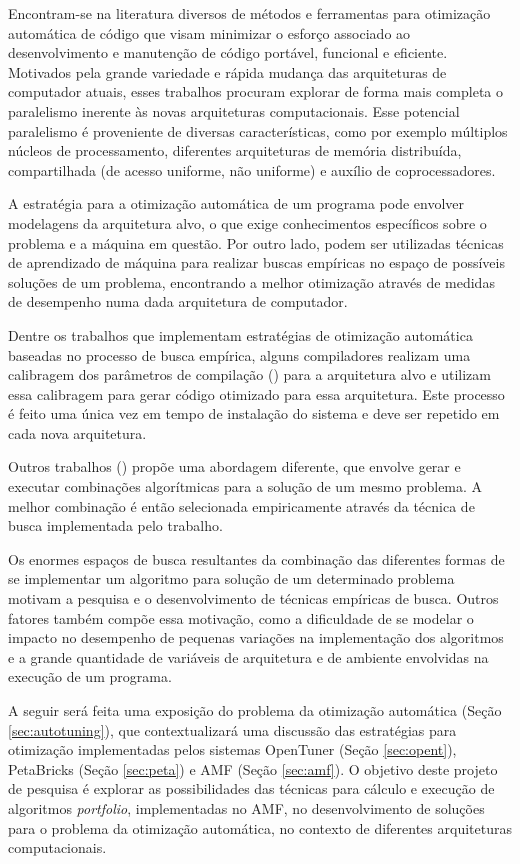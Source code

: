 \documentclass[a4paper, 12pt]{article}
\begin{document}
Encontram-se na literatura diversos de métodos e ferramentas para otimização 
automática de código que visam minimizar o esforço associado ao desenvolvimento
e manutenção de código portável, funcional e eficiente. Motivados pela grande
variedade e rápida mudança das arquiteturas de computador atuais, esses 
trabalhos procuram explorar de forma mais completa o paralelismo inerente às
novas arquiteturas computacionais. Esse potencial paralelismo é proveniente de
diversas características, como por exemplo múltiplos núcleos de processamento, 
diferentes arquiteturas de memória distribuída, compartilhada (de acesso 
uniforme, não uniforme) e auxílio de coprocessadores.

A estratégia para a otimização automática de um programa pode envolver 
modelagens da arquitetura alvo, o que exige conhecimentos específicos sobre o 
problema e a máquina em questão. Por outro lado, podem ser utilizadas técnicas
de aprendizado de máquina para realizar buscas empíricas no espaço de possíveis
soluções de um problema, encontrando a melhor otimização através de medidas de 
desempenho numa dada arquitetura de computador.

Dentre os trabalhos que implementam estratégias de otimização automática 
baseadas no processo de busca empírica, alguns compiladores realizam uma 
calibragem dos parâmetros de compilação (\citet{bilmes1997,whaley1998}) para a
arquitetura alvo e utilizam essa calibragem para gerar código otimizado para
essa arquitetura. Este processo é feito uma única vez em tempo de instalação
do sistema e deve ser repetido em cada nova arquitetura.

Outros trabalhos (\citet{goldman2012framework,mitcsail-tr:2014,
vuduc2004}) propõe uma abordagem diferente, que envolve gerar e executar
combinações algorítmicas para a solução de um mesmo problema. A melhor
combinação é então selecionada empiricamente através da técnica de busca
implementada pelo trabalho.

Os enormes espaços de busca resultantes da combinação das diferentes formas de
se implementar um algoritmo para solução de um determinado problema motivam
a pesquisa e o desenvolvimento de técnicas empíricas de busca. Outros fatores 
também compõe essa motivação, como a dificuldade de se modelar o impacto no 
desempenho de pequenas variações na implementação dos algoritmos e a grande 
quantidade de variáveis de arquitetura e de ambiente envolvidas na execução de 
um programa.

A seguir será feita uma exposição do problema da otimização automática 
(Seção \ref{sec:autotuning}), que contextualizará uma discussão das 
estratégias para otimização implementadas pelos sistemas 
OpenTuner (Seção \ref{sec:opent}), PetaBricks (Seção \ref{sec:peta}) e AMF
(Seção \ref{sec:amf}). O objetivo deste projeto de pesquisa é explorar as 
possibilidades das técnicas para cálculo e execução de algoritmos
\emph{portfolio}, implementadas no AMF, no desenvolvimento de soluções para o
problema da otimização automática, no contexto de diferentes arquiteturas 
computacionais.
\end{document}
